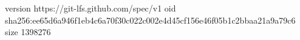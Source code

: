 version https://git-lfs.github.com/spec/v1
oid sha256:ee65d6a946f1eb4c6a70f30c022c002e4d45cf156e46f05b1c2bbaa21a9a79c6
size 1398276
